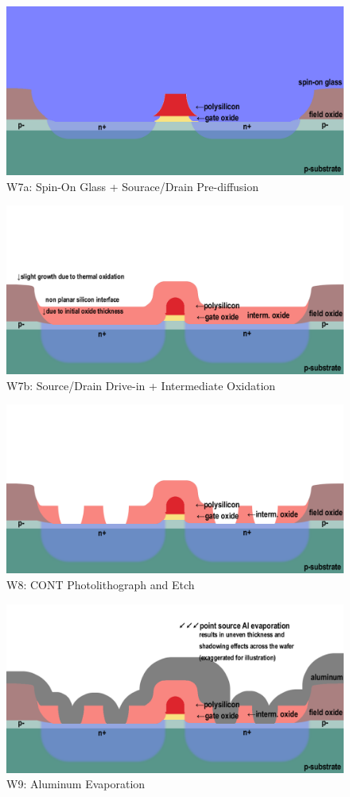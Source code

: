 \documentclass{article}
\begin{document}
\begin{figure}[H]
\centering
\includegraphics[width=350pt]{CrossSections_Updates/MOSFETw7a.png}
\caption{W7a: Spin-On Glass + Sourace/Drain Pre-diffusion}
\end{figure}
\begin{figure}[H]
\centering
\includegraphics[width=350pt]{CrossSections_Updates/MOSFETw7b.png}
\caption{W7b: Source/Drain Drive-in + Intermediate Oxidation}
\end{figure}
\begin{figure}[H]
\centering
\includegraphics[width=350pt]{CrossSections/MOSFETlabprofiles/MOSFETw8.png}
\caption{W8: CONT Photolithograph and Etch}
\end{figure}
\begin{figure}[H]
\centering
\includegraphics[width=350pt]{CrossSections_Updates/MOSFETw9.png}
\caption{W9: Aluminum Evaporation}
\end{figure}
\end{document}
